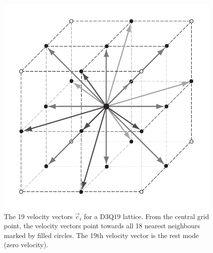 \begin{figure}[htp]
\begin{center}
  \includegraphics[height=0.3\textheight]{figures/latticeboltzmann-grid}
  \caption[]{The 19 velocity vectors $\vec{c}_{i}$ for a D$3$Q$19$ lattice. From
  the central grid point, the velocity vectors point towards all 18
  nearest neighbours marked by filled circles. The 19th velocity vector is the
  rest mode (zero velocity).}
  \label{fig:model-d3q18grid}
\end{center}
\end{figure}

